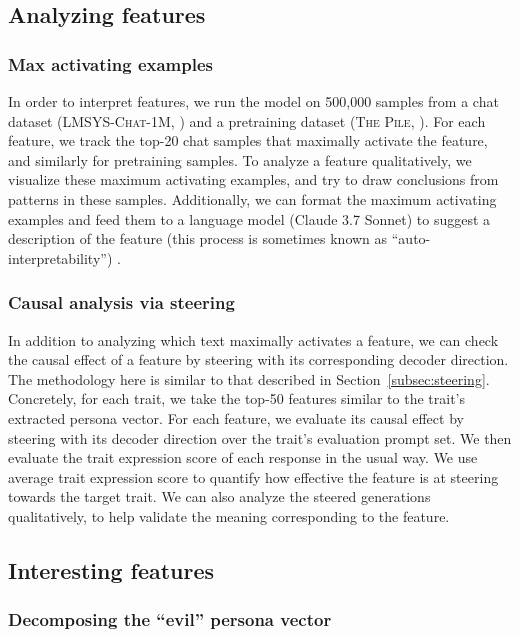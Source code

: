 \subsection{Analyzing features}

\subsubsection{Max activating examples}

In order to interpret features, we run the model on 500,000 samples from a chat dataset (\textsc{LMSYS-Chat-1M}, \cite{zheng2024lmsyschat1mlargescalerealworldllm}) and a pretraining dataset (\textsc{The Pile}, \cite{gao2020pile800gbdatasetdiverse}). For each feature, we track the top-20 chat samples that maximally activate the feature, and similarly for pretraining samples.
To analyze a feature qualitatively, we visualize these maximum activating examples, and try to draw conclusions from patterns in these samples. Additionally, we can format the maximum activating examples and feed them to a language model (Claude 3.7 Sonnet) to suggest a description of the feature (this process is sometimes known as ``auto-interpretability'') \citep{bills2023language}.

\subsubsection{Causal analysis via steering}

In addition to analyzing which text maximally activates a feature, we can check the causal effect of a feature by steering with its corresponding decoder direction.
The methodology here is similar to that described in Section~\ref{subsec:steering}.
Concretely, for each trait, we take the top-50 features similar to the trait's extracted persona vector.
For each feature, we evaluate its causal effect by steering with its decoder direction over the trait's evaluation prompt set.
We then evaluate the trait expression score of each response in the usual way.
We use average trait expression score to quantify how effective the feature is at steering towards the target trait.
We can also analyze the steered generations qualitatively, to help validate the meaning corresponding to the feature.

\subsection{Interesting features}
\subsubsection{Decomposing the ``evil'' persona vector}

